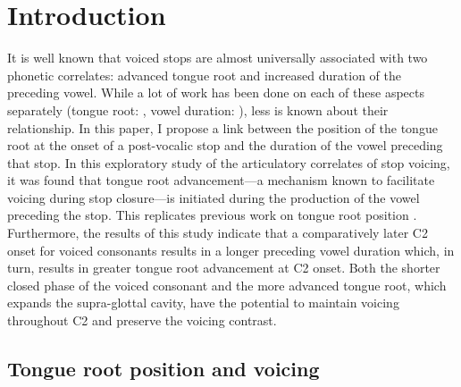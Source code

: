 \documentclass[preprint]{JASAnew}
\begin{document}

\maketitle




\hypertarget{introduction}{%
\section{Introduction}\label{introduction}}

\label{s:intro}

It is well known that voiced stops are almost universally associated
with two phonetic correlates: advanced tongue root and increased
duration of the preceding vowel. While a lot of work has been done on
each of these aspects separately (tongue root:
\citealt{kent1969, perkell1969, westbury1983, rothenberg1967, ahn2018},
vowel duration:
\citealt{house1953, peterson1960, chen1970, klatt1973, lisker1974, farnetani1986, fowler1992}),
less is known about their relationship. In this paper, I propose a link
between the position of the tongue root at the onset of a post-vocalic
stop and the duration of the vowel preceding that stop. In this
exploratory study of the articulatory correlates of stop voicing, it was
found that tongue root advancement---a mechanism known to facilitate
voicing during stop closure---is initiated during the production of the
vowel preceding the stop. This replicates previous work on tongue root
position
\citep{kent1969, perkell1969, westbury1983, rothenberg1967, ahn2018}.
Furthermore, the results of this study indicate that a comparatively
later C2 onset for voiced consonants results in a longer preceding vowel
duration which, in turn, results in greater tongue root advancement at
C2 onset. Both the shorter closed phase of the voiced consonant and the
more advanced tongue root, which expands the supra-glottal cavity, have
the potential to maintain voicing throughout C2 and preserve the voicing
contrast.

\hypertarget{tongue-root-position-and-voicing}{%
\subsection{Tongue root position and
voicing}\label{tongue-root-position-and-voicing}}
\end{document}

